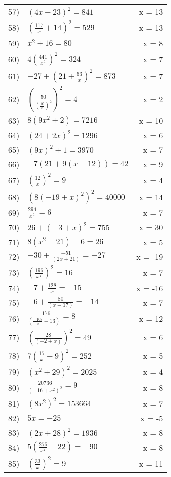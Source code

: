 \documentclass{article}
\begin{document}
\begin{longtable}{l p{} r}
57) & ${ (4x - 23) }^2 = 841$ & x = 13 \\ 
58) & ${ (\frac{ 117 }{ x } + 14) }^2 = 529$ & x = 13 \\ 
59) & ${ x }^2 + 16 = 80$ & x = 8 \\ 
60) & $4{ (\frac{ 441 }{ { x }^2 }) }^2 = 324$ & x = 7 \\ 
61) & $-27 + { (21 + \frac{ 63 }{ x }) }^2 = 873$ & x = 7 \\ 
62) & ${ (\frac{ 50 }{ { (\frac{ 10 }{ x }) }^2 }) }^2 = 4$ & x = 2 \\ 
63) & $8(9{ x }^2 + 2) = 7216$ & x = 10 \\ 
64) & ${ (24 + 2x) }^2 = 1296$ & x = 6 \\ 
65) & ${ (9x) }^2 + 1 = 3970$ & x = 7 \\ 
66) & $-7(21 + 9(x - 12)) = 42$ & x = 9 \\ 
67) & ${ (\frac{ 12 }{ x }) }^2 = 9$ & x = 4 \\ 
68) & ${ (8{ (-19 + x) }^2) }^2 = 40000$ & x = 14 \\ 
69) & $\frac{ 294 }{ { x }^2 } = 6$ & x = 7 \\ 
70) & $26 + { (-3 + x) }^2 = 755$ & x = 30 \\ 
71) & $8({ x }^2 - 21) - 6 = 26$ & x = 5 \\ 
72) & $-30 + \frac{ -51 }{ (2x + 21) } = -27$ & x = -19 \\ 
73) & ${ (\frac{ 196 }{ { x }^2 }) }^2 = 16$ & x = 7 \\ 
74) & $-7 + \frac{ 128 }{ x } = -15$ & x = -16 \\ 
75) & $-6 + \frac{ 80 }{ (x - 17) } = -14$ & x = 7 \\ 
76) & $\frac{ -176 }{ (\frac{ -108 }{ x } - 13) } = 8$ & x = 12 \\ 
77) & ${ (\frac{ 28 }{ (-2 + x) }) }^2 = 49$ & x = 6 \\ 
78) & $7{ (\frac{ 15 }{ x } - 9) }^2 = 252$ & x = 5 \\ 
79) & ${ ({ x }^2 + 29) }^2 = 2025$ & x = 4 \\ 
80) & $\frac{ 20736 }{ { (-16 + { x }^2) }^2 } = 9$ & x = 8 \\ 
81) & ${ (8{ x }^2) }^2 = 153664$ & x = 7 \\ 
82) & $5x = -25$ & x = -5 \\ 
83) & ${ (2x + 28) }^2 = 1936$ & x = 8 \\ 
84) & $5(\frac{ 256 }{ { x }^2 } - 22) = -90$ & x = 8 \\ 
85) & ${ (\frac{ 33 }{ x }) }^2 = 9$ & x = 11 \\ 

\end{longtable}
\end{document}
